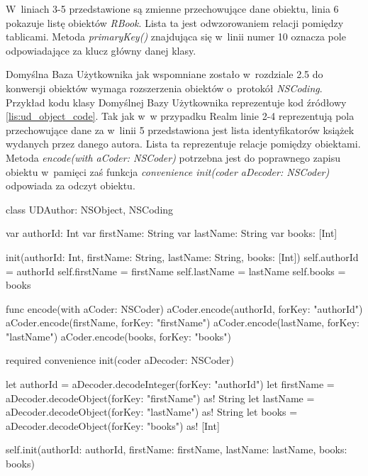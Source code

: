  W~liniach 3-5 przedstawione są zmienne przechowujące dane obiektu, linia 6 pokazuje listę obiektów \textit{RBook}. Lista ta jest odwzorowaniem relacji pomiędzy tablicami. Metoda \textit{primaryKey()} znajdująca się w~linii numer 10 oznacza pole odpowiadające za klucz główny danej klasy. 

Domyślna Baza Użytkownika jak wspomniane zostało w~rozdziale 2.5 do konwersji obiektów wymaga rozszerzenia obiektów o~protokół \textit{NSCoding}. Przykład kodu klasy Domyślnej Bazy Użytkownika reprezentuje kod źródłowy \ref{lis:ud_object_code}. Tak jak w~w przypadku Realm linie 2-4 reprezentują pola przechowujące dane za w~linii 5 przedstawiona jest lista identyfikatorów książek wydanych przez danego autora. Lista ta reprezentuje relacje pomiędzy obiektami. Metoda \textit{encode(with aCoder: NSCoder)} potrzebna jest do poprawnego zapisu obiektu w~pamięci zaś funkcja \textit{convenience init(coder aDecoder: NSCoder)} odpowiada za odczyt obiektu.

\begin{code}[
		language=swift,
		caption={Przykład obiektu Domyślnej Bazy Użytkownika},
		label={lis:ud_object_code},
	]
class UDAuthor: NSObject, NSCoding {
    var authorId: Int
    var firstName: String
    var lastName: String
    var books: [Int]
    
    init(authorId: Int, firstName: String, lastName: String, books: [Int]) {
        self.authorId = authorId
        self.firstName = firstName
        self.lastName = lastName
        self.books = books
    }
    
    func encode(with aCoder: NSCoder) {
        aCoder.encode(authorId, forKey: "authorId")
        aCoder.encode(firstName, forKey: "firstName")
        aCoder.encode(lastName, forKey: "lastName")
        aCoder.encode(books, forKey: "books")
    }
    
    required convenience init(coder aDecoder: NSCoder) {
        let authorId = aDecoder.decodeInteger(forKey: "authorId")
        let firstName = aDecoder.decodeObject(forKey: "firstName") as! String
        let lastName = aDecoder.decodeObject(forKey: "lastName") as! String
        let books = aDecoder.decodeObject(forKey: "books") as! [Int]
        
        self.init(authorId: authorId, firstName: firstName, lastName: lastName, books: books)
    }
}

\end{code}

